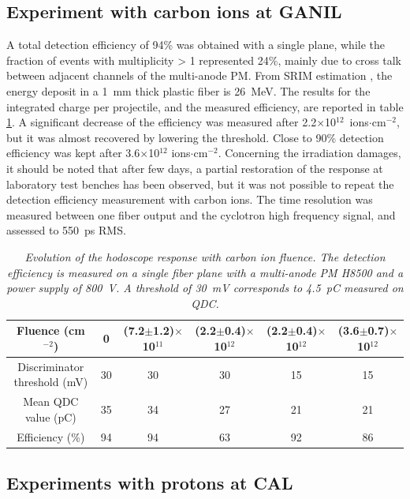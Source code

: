 \documentclass[a4paper,11pt]{article}
\begin{document}
\subsection{Experiment with carbon ions at GANIL}
A total detection efficiency of 94\% was obtained with a single plane, while the fraction of events with multiplicity > 1 represented 24\%, mainly due to cross talk between adjacent channels of the multi-anode PM.
From SRIM estimation \cite{Ziegler2010}, the energy deposit in a 1~mm thick plastic fiber is 26~MeV. The results for the integrated charge per projectile, and the measured efficiency, are reported in table \ref{tab:GANIL}. A significant decrease of the efficiency was measured after 2.2$\times$10$^{12}$~ions$\cdot$cm$^{-2}$, but it was almost recovered by lowering the threshold. 
Close to 90\% detection efficiency was kept after 3.6$\times$10$^{12}$ ions$\cdot$cm$^{-2}$.
Concerning the irradiation damages, it should be noted that after few days, a partial restoration of the response at laboratory test benches has been observed, but it was not possible to repeat the detection efficiency measurement with carbon ions. 
The time resolution was measured between one fiber output and the cyclotron high frequency signal, and assessed to 550~ps RMS. 
\begin{table}[htb]
\caption{\small{\textit{Evolution of the hodoscope response with carbon ion fluence. The detection efficiency is measured on a single fiber plane with a multi-anode PM H8500 and a power supply of 800~V. A threshold of 30~mV corresponds to 4.5~pC measured on QDC.}}}
\centering
\begin{tabular}{|c|c|c|c|c|c|}
\hline
Fluence (cm$^{-2}$)& 0 & (7.2$\pm$1.2)$\times$10$^{11}$ & (2.2$\pm$0.4)$\times$10$^{12}$ & (2.2$\pm$0.4)$\times$10$^{12}$ & (3.6$\pm$0.7)$\times$10$^{12}$\\
\hline
\makecell{Discriminator\\threshold (mV)} & 30 & 30 & 30 & 15 & 15\\
\hline
\makecell{Mean QDC\\value (pC)} & 35 & 34 & 27 & 21 & 21\\
\hline
Efficiency (\%) & 94 & 94 & 63 & 92 & 86\\
\hline
\end{tabular}
\label{tab:GANIL}
\end{table}

\subsection{Experiments with protons at CAL}
\end{document}
